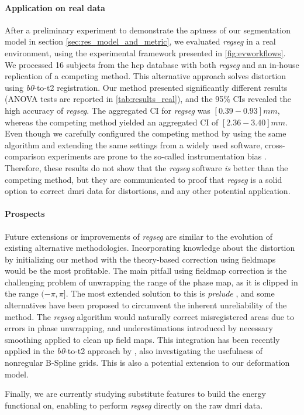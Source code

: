\paragraph*{Application on real data}
After a preliminary experiment to demonstrate the aptness of our segmentation model
  in section \autoref{sec:res_model_and_metric}, we evaluated \emph{regseg} in
  a real environment, using the experimental framework presented in \autoref{fig:evworkflows}.
We processed 16 subjects from the \gls*{hcp} database with both \emph{regseg}
  and an in-house replication of a competing method.
This alternative approach solves distortion using \emph{b0}-to-\gls*{t2} registration.
Our method presented significantly different results (ANOVA tests are reported in
  \autoref{tab:results_real}), and the 95\% CIs revealed the high accuracy of
  \emph{regseg}.
The aggregated CI for \emph{regseg} was $[0.39 - 0.93] mm$, whereas the competing method
  yielded an aggregated CI of $[2.36 - 3.40] mm$.
Even though we carefully configured the competing method by using the same algorithm and
  extending the same settings from a widely used software, cross-comparison
  experiments are prone to the so-called instrumentation bias \citep{tustison_instrumentation_2013}.
Therefore, these results do not show that the \emph{regseg} software \emph{is} better than the
  competing method, but they are communicated to proof that \emph{regseg} is a solid option to
  correct \gls*{dmri} data for distortions, and any other potential application.

\paragraph*{Prospects}
Future extensions or improvements of \emph{regseg} are similar to the evolution of existing
  alternative methodologies.
Incorporating knowledge about the distortion by initializing our method with the theory-based
  correction using fieldmaps would be the most profitable.
The main pitfall using fieldmap correction is the challenging problem of unwrapping the
  range of the phase map, as it is clipped in the range $(-\pi, \pi]$.
The most extended solution to this is \emph{prelude} \citep{jenkinson_fast_2003}, and some
  alternatives have been proposed \citep{zhou_reliable_2009,daga_susceptibility_2014} to
  circumvent the inherent unreliability of the method.
The \emph{regseg} algorithm would naturally correct misregistered areas due to errors in
  phase unwrapping, and underestimations introduced by necessary smoothing
  applied to clean up field maps.
This integration has been recently applied in the \emph{b0}-to-\gls*{t2} approach
  by \cite{irfanoglu_susceptibility_2011}, also investigating the usefulness of
  nonregular B-Spline grids.
This is also a potential extension to our deformation model.

Finally, we are currently studying substitute features to build the energy functional on,
  enabling to perform \emph{regseg} directly on the raw \gls*{dmri} data.